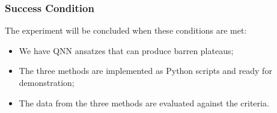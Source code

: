 \subsubsection{Success Condition}
The experiment will be concluded when these conditions are met:
\begin{itemize}
    \item We have QNN ansatzes that can produce barren plateaus;
    \item The three methods are implemented as Python scripts and ready for demonstration;
    \item The data from the three methods are evaluated against the criteria.
\end{itemize}